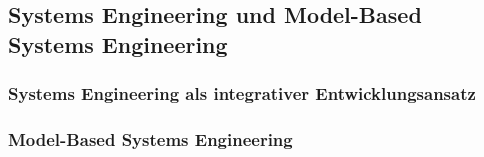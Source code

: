 \subsection{Systems Engineering und Model-Based Systems Engineering}
\label{sec:mbse_foundations}

\subsubsection{Systems Engineering als integrativer Entwicklungsansatz}
\label{sec:systems_engineering_foundation}

%
%
%
%
%
%


\subsubsection{Model-Based Systems Engineering}
\label{sec:mbse_definition}

